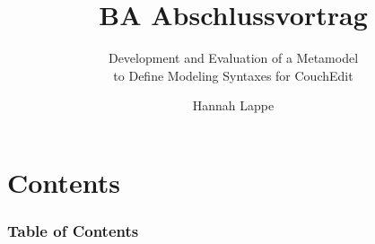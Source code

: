\documentclass[
  aspectratio=169
  ]{beamer}
\title{BA Abschlussvortrag}
\subtitle{Development and Evaluation of a Metamodel \\ to Define Modeling Syntaxes for CouchEdit}
\author{Hannah Lappe}
\institute
{\\Institut für Softwaretechnik und Programmiersprachen}
\begin{document}
\hspace*{-1.49cm}
\frame[plain]{\titlepage}

\hspace*{-0.7cm}
\section*{Contents} %
\begin{frame}
  \frametitle{Table of Contents}
  \tableofcontents
\end{frame}







\end{document}
